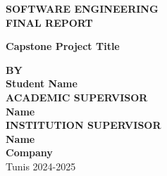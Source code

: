 \begin{titlepage}
\centering

\vspace*{-2cm}


\vspace{1.5cm}

{\fontsize{14pt}{16pt}\selectfont\textbf{SOFTWARE ENGINEERING}}\\[0.2cm]
{\fontsize{14pt}{16pt}\selectfont\textbf{FINAL REPORT}}\\[1.5cm]

\begin{minipage}{0.9\textwidth}
\centering
{\fontsize{14pt}{16pt}\selectfont\textbf{
Capstone Project Title}}
\end{minipage}

\vspace{2cm}

{\fontsize{12pt}{14pt}\selectfont\textbf{BY}}\\
{\fontsize{12pt}{14pt}\selectfont\textbf{Student Name}}\\[1.5cm]

{\fontsize{12pt}{14pt}\selectfont\textbf{ACADEMIC SUPERVISOR}}\\
{\fontsize{12pt}{14pt}\selectfont\textbf{Name}}\\[1.5cm]

{\fontsize{12pt}{14pt}\selectfont\textbf{INSTITUTION SUPERVISOR}}\\
{\fontsize{12pt}{14pt}\selectfont\textbf{Name}}\\[1.5cm]

{\fontsize{12pt}{14pt}\selectfont\textbf{Company}}\\[0.5cm]

\vfill
{\fontsize{12pt}{14pt}\selectfont Tunis 2024-2025}

\end{titlepage}
